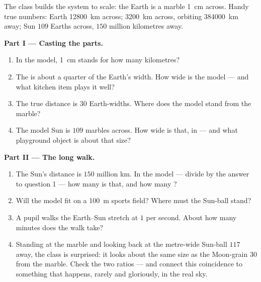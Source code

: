 \begin{problem}\label{pb:g6:sun-earth-moon:1}
The class builds the system to scale: the Earth is a marble
\qty{1}{cm} across. Handy true numbers: Earth \qty{12800}{km}
across;  \qty{3200}{km} across, orbiting \qty{384000}{km}
away; Sun $109$ Earths across, $150$ million kilometres away.

\medskip\noindent\textbf{Part I --- Casting the parts.}
\begin{enumerate}
  \item In the model, \qty{1}{cm} stands for how many kilometres?
  \item The  is about a quarter of the Earth's width. How
        wide is the model  --- and what kitchen item plays it
        well?
  \item The true  distance is $30$ Earth-widths. Where does
        the model  stand from the marble?
  \item The model Sun is $109$ marbles across. How wide is that,
        in  --- and what playground object is about
        that size?
\end{enumerate}

\medskip\noindent\textbf{Part II --- The long walk.}
\begin{enumerate}[resume]
  \item The Sun's distance is $150$ million km. In the model ---
        divide by the answer to question 1 --- how many
         is that, and how many ?
  \item Will the model fit on a \qty{100}{m} sports field? Where
        must the Sun-ball stand?
  \item A pupil walks the Earth--Sun stretch at $1$  per
        second. About how many minutes does the walk take?
  \item Standing at the marble and looking back at the
        metre-wide Sun-ball $117$  away, the class is
        surprised: it looks about the same size as the
         Moon-grain $30$  from the
        marble. Check the two ratios --- and connect this
        coincidence to something that happens, rarely and
        gloriously, in the real sky.
\end{enumerate}


\end{problem}
